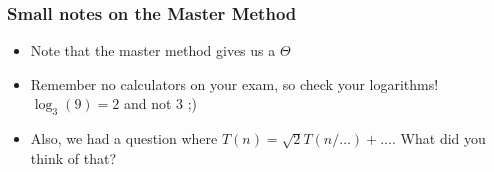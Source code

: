 \begin{frame}
	\frametitle{Small notes on the Master Method}
	
	\begin{itemize}
		\item Note that the master method gives us a $\Theta$
			\pause
		\item Remember no calculators on your exam, so check your logarithms! $\log_3(9) = 2$ and not $3$ ;)
			\pause
		\item Also, we had a question where $T(n) = \sqrt{2}T(n/\dots) + \dots$. What did you think of that?
	\end{itemize}
\end{frame}
